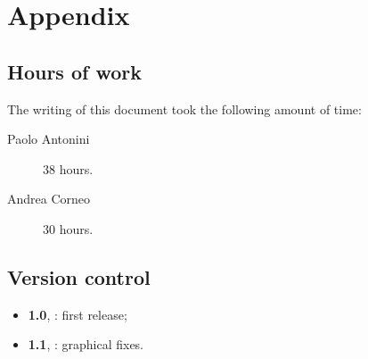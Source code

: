 \chapter{Appendix}\label{chap:appendix}

\section*{Hours of work}
The writing of this document took the following amount of time:

\begin{description}
	\item [Paolo Antonini] 38 hours.
	\item [Andrea Corneo] 30 hours.
\end{description}

\section*{Version control}
\begin{itemize}
	\item \textbf{1.0}, : first release;
	\item \textbf{1.1}, : graphical fixes.%
\end{itemize}
